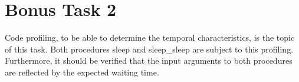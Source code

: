 	\section{Bonus Task 2} %
	\label{sec:bonus_task_2}
		Code profiling, to be able to determine the temporal characteristics, is the topic of this task. Both procedures sleep and sleep\_sleep are subject to this profiling. Furthermore, it should be verified that the input arguments to both procedures are reflected by the expected waiting time.